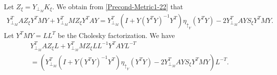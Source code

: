 \documentclass[11pt]{article}
\numberwithin{equation}{section}
\begin{document}
Let $Z_\xi=Y_{\perp_M}K_\xi$. We obtain from \eqref{Precond-Metric1-22} that
\begin{align*} 
  Y_{\perp_M}^TAZ_\xi Y^TMY+Y_{\perp_M}^TMZ_\xi Y^TAY=Y_{\perp_M}^T(I+Y(Y^TY)^{-1}Y^T)\eta_{\uparrow_Y}(Y^TY)-2Y_{\perp_M}^TAYS_\xi Y^TMY. 
\end{align*}
Let $Y^TMY=LL^T$ be the Cholesky factorization. We have 
\begin{align*}
  & Y_{\perp_M}^TAZ_\xi L+Y_{\perp_M}^TMZ_\xi LL^{-1}Y^TAYL^{-T}\\ 
  & =(Y_{\perp_M}^T(I+Y(Y^TY)^{-1}Y^T)\eta_{\uparrow_Y}(Y^TY)-2Y_{\perp_M}^TAYS_\xi Y^TMY)L^{-T}. 
\end{align*}
\end{document}

